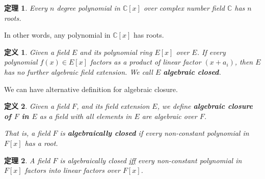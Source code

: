 \documentclass[utf8]{ctexbook}
\newtheorem{theorem}{定理}[section]
\newtheorem{definition}{定义}[section]
\begin{document}
\begin{theorem}
\label{theorem_4_4_1_fundamental_thm_algebra}
Every $n$ degree polynomial in $\mathbb{C}[x]$ over complex number field $\mathbb{C}$ has $n$ roots.
\end{theorem}

In other words, any polynomial in $\mathbb{C}[x]$ has roots.

\begin{definition}
\label{def_algebraic_closed_1}
Given a field $E$ and its polynomial ring $E[x]$ over $E$. If every polynomial $f(x) \in E[x]$ factors as a product of linear factor $(x + a_i)$, then $E$ has no further algebraic field extension. We call $E$ \textbf{algebraic closed}.
\end{definition}

We can have alternative definition for algebraic closure.

\begin{definition}
\label{def_algebraic_closed_2}
Given a field $F$, and its field extension $E$, we define \textbf{algebraic closure of $F$ in $E$} as a field with all elements in $E$ are algebraic over $F$.

That is, a field $F$ is \textbf{algebraically closed} if every non-constant polynomial in $F[x]$ has a root.
\end{definition}


\begin{theorem}
\label{theorem_4_4_extra_1_algebraic_close_iff}
A field $F$ is algebraically closed \underline{iff} every non-constant polynomial in $F[x]$ factors into linear factors over $F[x]$.
\end{theorem}
\end{document}
